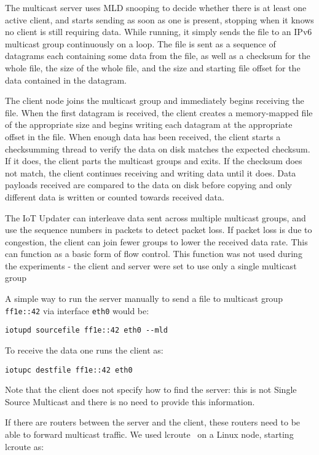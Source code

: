 \documentclass[a4paper,11pt,twocolumn]{article}
\begin{document}
The multicast server uses MLD snooping to decide whether there is at
least one active client, and starts sending as soon as one is present,
stopping when it knows no client is still requiring data. While running,
it simply sends the file to an IPv6 multicast group continuously on a
loop. The file is sent as a sequence of datagrams each containing some
data from the file, as well as a checksum for the whole file, the size
of the whole file, and the size and starting file offset for the data
contained in the datagram.

The client node joins the multicast group and immediately begins receiving
the file.  When the first datagram is received, the client creates a
memory-mapped file of the appropriate size and begins writing each datagram at
the appropriate offset in the file.  When enough data has been received, the
client starts a checksumming thread to verify the data on disk matches the
expected checksum.  If it does, the client parts the multicast groups and exits.
If the checksum does not match, the client continues receiving and writing data
until it does.  Data payloads received are compared to the data on disk before
copying and only different data is written or counted towards received data.

The IoT Updater can interleave data sent across multiple multicast groups, and
use the sequence numbers in packets to detect packet loss.  If packet loss is
due to congestion, the client can join fewer groups to lower the received data
rate.  This can function as a basic form of flow control.  This function was not
used during the experiments - the client and server were set to use only a
single multicast group

A simple way to run the server manually to send a file to multicast
group {\tt ff1e::42} via interface {\tt eth0} would be:

\begin{verbatim}
iotupd sourcefile ff1e::42 eth0 --mld
\end{verbatim}

To receive the data one runs the client as:

\begin{verbatim}
iotupc destfile ff1e::42 eth0
\end{verbatim}

Note that the client does not specify how to find the server: this is
not Single Source Multicast and there is no need to provide this
information.

If there are routers between the server and the client, these routers need to
be able to forward multicast traffic.  We used lcroute~\cite{lcroute:sources}
on a Linux node, starting lcroute as:
\end{document}
